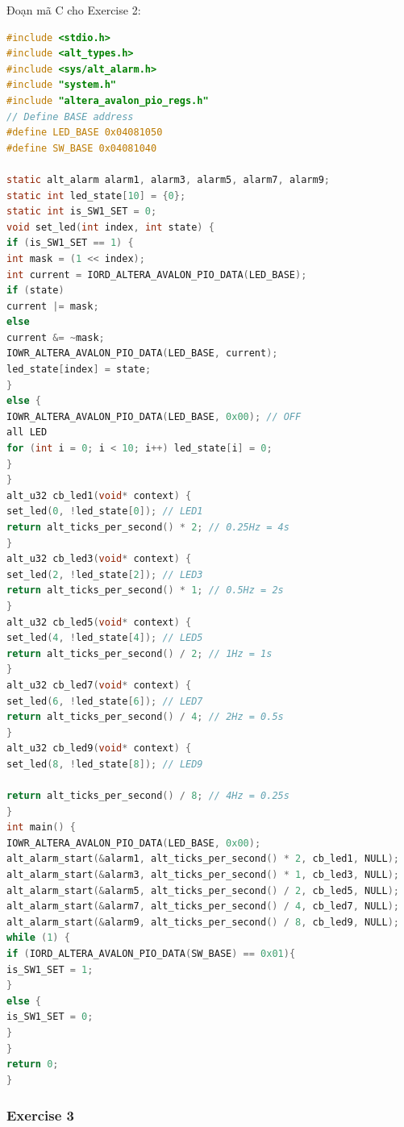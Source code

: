 Đoạn mã C cho Exercise 2:
\begin{lstlisting}[language=C, caption={C Source Code - LAB4\&5 Exercise 2}]
#include <stdio.h>
#include <alt_types.h>
#include <sys/alt_alarm.h>
#include "system.h"
#include "altera_avalon_pio_regs.h"
// Define BASE address
#define LED_BASE 0x04081050
#define SW_BASE 0x04081040

static alt_alarm alarm1, alarm3, alarm5, alarm7, alarm9;
static int led_state[10] = {0};
static int is_SW1_SET = 0;
void set_led(int index, int state) {
if (is_SW1_SET == 1) {
int mask = (1 << index);
int current = IORD_ALTERA_AVALON_PIO_DATA(LED_BASE);
if (state)
current |= mask;
else
current &= ~mask;
IOWR_ALTERA_AVALON_PIO_DATA(LED_BASE, current);
led_state[index] = state;
}
else {
IOWR_ALTERA_AVALON_PIO_DATA(LED_BASE, 0x00); // OFF
all LED
for (int i = 0; i < 10; i++) led_state[i] = 0;
}
}
alt_u32 cb_led1(void* context) {
set_led(0, !led_state[0]); // LED1
return alt_ticks_per_second() * 2; // 0.25Hz = 4s
}
alt_u32 cb_led3(void* context) {
set_led(2, !led_state[2]); // LED3
return alt_ticks_per_second() * 1; // 0.5Hz = 2s
}
alt_u32 cb_led5(void* context) {
set_led(4, !led_state[4]); // LED5
return alt_ticks_per_second() / 2; // 1Hz = 1s
}
alt_u32 cb_led7(void* context) {
set_led(6, !led_state[6]); // LED7
return alt_ticks_per_second() / 4; // 2Hz = 0.5s
}
alt_u32 cb_led9(void* context) {
set_led(8, !led_state[8]); // LED9

return alt_ticks_per_second() / 8; // 4Hz = 0.25s
}
int main() {
IOWR_ALTERA_AVALON_PIO_DATA(LED_BASE, 0x00);
alt_alarm_start(&alarm1, alt_ticks_per_second() * 2, cb_led1, NULL);
alt_alarm_start(&alarm3, alt_ticks_per_second() * 1, cb_led3, NULL);
alt_alarm_start(&alarm5, alt_ticks_per_second() / 2, cb_led5, NULL);
alt_alarm_start(&alarm7, alt_ticks_per_second() / 4, cb_led7, NULL);
alt_alarm_start(&alarm9, alt_ticks_per_second() / 8, cb_led9, NULL);
while (1) {
if (IORD_ALTERA_AVALON_PIO_DATA(SW_BASE) == 0x01){
is_SW1_SET = 1;
}
else {
is_SW1_SET = 0;
}
}
return 0;
}
\end{lstlisting}

\subsubsection{Exercise 3}

